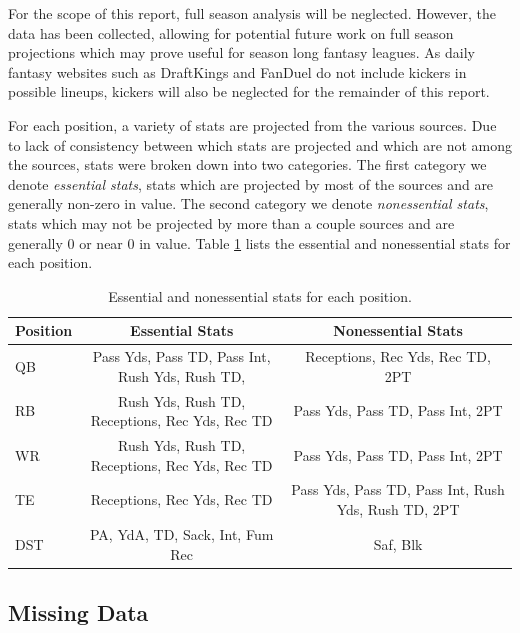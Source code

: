 \documentclass[12pt]{article}
\begin{document}
For the scope of this report, full season analysis will be neglected. However, the data has been collected, allowing for potential future work on full season projections which may prove useful for season long fantasy leagues. As daily fantasy websites such as DraftKings and FanDuel do not include kickers in possible lineups, kickers will also be neglected for the remainder of this report.\bigskip

For each position, a variety of stats are projected from the various sources. Due to lack of consistency between which stats are projected and which are not among the sources, stats were broken down into two categories. The first category we denote \textit{essential stats}, stats which are projected by most of the sources and are generally non-zero in value. The second category we denote \textit{nonessential stats}, stats which may not be projected by more than a couple sources and are generally 0 or near 0 in value. Table \ref{stats table} lists the essential and nonessential stats for each position.

\begin{table}[H]
\caption{Essential and nonessential stats for each position.}
\small
\label{stats table}
\centering
\begin{adjustbox}{width =\textwidth}
\begin{tabular}{lcc}
	\toprule
	Position        &  Essential Stats            &  Nonessential Stats \\
	\midrule
	QB   &  Pass Yds, Pass TD, Pass Int, Rush Yds, Rush TD,   &   Receptions, Rec Yds, Rec TD, 2PT\\
	RB   &  Rush Yds, Rush TD, Receptions, Rec Yds, Rec TD   &   Pass Yds, Pass TD, Pass Int, 2PT \\
	WR   &  Rush Yds, Rush TD, Receptions, Rec Yds, Rec TD   &   Pass Yds, Pass TD, Pass Int, 2PT \\
	TE   &  Receptions, Rec Yds, Rec TD    &   Pass Yds, Pass TD, Pass Int, Rush Yds, Rush TD, 2PT\\
	DST  &  PA, YdA, TD, Sack, Int, Fum Rec & Saf, Blk \\
	\bottomrule
\end{tabular}
\end{adjustbox}
\end{table}


\subsection{Missing Data}
\end{document}
